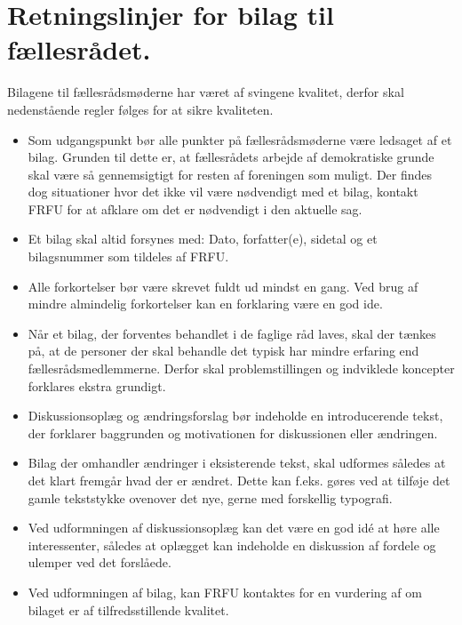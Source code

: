 \section{Retningslinjer for bilag til fællesrådet.}

Bilagene til fællesrådsmøderne har været af svingene kvalitet, derfor skal nedenstående regler følges for at sikre kvaliteten.

\begin{itemize}
\item Som udgangspunkt bør alle punkter på fællesrådsmøderne være ledsaget af et bilag. Grunden til dette er, at fællesrådets arbejde af demokratiske grunde skal være så gennemsigtigt for resten af foreningen som muligt.
Der findes dog situationer hvor det ikke vil være nødvendigt med et bilag, kontakt FRFU for at afklare om det er nødvendigt i den aktuelle sag.
\item Et bilag skal altid forsynes med: Dato, forfatter(e), sidetal og et bilagsnummer som tildeles af FRFU.
\item Alle forkortelser bør være skrevet fuldt ud mindst en gang. Ved brug af mindre almindelig forkortelser kan en forklaring være en god ide.
\item Når et bilag, der forventes behandlet i de faglige råd laves, skal der tænkes på, at de personer der skal behandle det typisk har mindre erfaring end fællesrådsmedlemmerne. Derfor skal problemstillingen og indviklede koncepter forklares ekstra grundigt.
\item Diskussionsoplæg og ændringsforslag bør indeholde en introducerende tekst, der forklarer baggrunden og motivationen for diskussionen eller ændringen.
\item Bilag der omhandler ændringer i eksisterende tekst, skal udformes således at det klart fremgår hvad der er ændret. Dette kan f.eks. gøres ved at tilføje det gamle tekststykke ovenover det nye, gerne med forskellig typografi.
\item Ved udformningen af diskussionsoplæg kan det være en god idé at høre alle interessenter, således at oplægget
kan indeholde en diskussion af fordele og ulemper ved det forslåede.
\item Ved udformningen af bilag, kan FRFU kontaktes for en vurdering af om bilaget er af tilfredsstillende kvalitet.
\end{itemize}